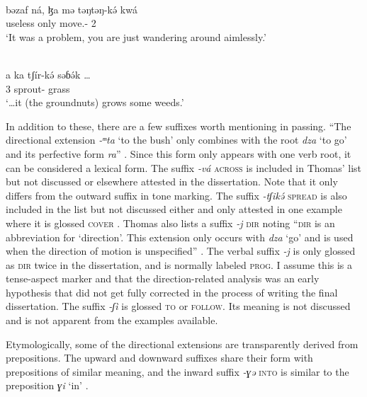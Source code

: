 \ea\label{ex2:saku1}
 \\
\gll bəzaf ná, ɮa mə təŋtəŋ-kə́ kwá \\
useless  only  move.- 2		 \\
\glt `It was a problem, you are just wandering around aimlessly.'

\ex\label{ex2:saku2}
 \\
\gll a	ka	tʃír-kə́	səɓə́k	…	 \\
	3	sprout-	grass		 \\
\glt `…it (the groundnuts) grows some weeds.'
\z 

In addition to these, there are a few suffixes worth mentioning in passing. “The directional extension \textit{-ᵐta} `to the bush' only combines with the root \textit{dza} ‘to go’ and its perfective form \textit{ra}” \citep[122]{thomasGrammarSakunSukur2014}. Since this form only appears with one verb root, it can be considered a lexical form. The suffix \textit{-vá} \textsc{across} is included in Thomas’ list but not discussed or elsewhere attested in the dissertation. Note that it only differs from the outward suffix in tone marking. The suffix \textit{-tʃikə́} \textsc{spread} is also included in the list but not discussed either and only attested in one example where it is glossed \textsc{cover} \citep[232]{thomasGrammarSakunSukur2014}. Thomas also lists a suffix \textit{-j} \textsc{dir} noting “\textsc{dir} is an abbreviation for ‘direction’. This extension only occurs with \textit{dza} ‘go’ and is used when the direction of motion is unspecified” \citep[120]{thomasGrammarSakunSukur2014}. The verbal suffix \textit{-j} is only glossed as \textsc{dir} twice in the dissertation, and is normally labeled \textsc{prog}. I assume this is a tense-aspect marker and that the direction-related analysis was an early hypothesis that did not get fully corrected in the process of writing the final dissertation. The suffix \textit{-ʃì} is glossed \textsc{to} or \textsc{follow}. Its meaning is not discussed and is not apparent from the examples available.

Etymologically, some of the directional extensions are transparently derived from prepositions. The upward and downward suffixes share their form with prepositions of similar meaning, and the inward suffix \textit{-ɣə} \textsc{into} is similar to the preposition \textit{ɣi} ‘in’ \citep[273]{thomasGrammarSakunSukur2014}. 

